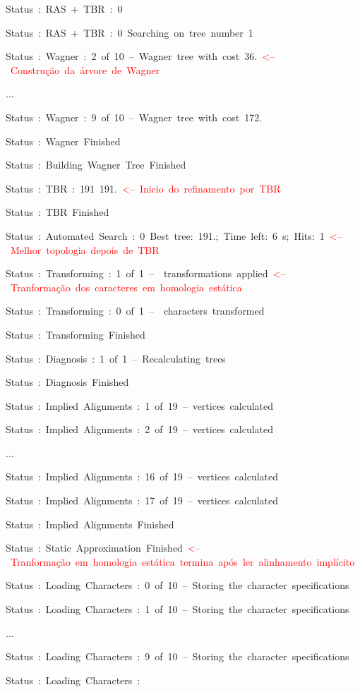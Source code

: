 \begin{refsection}
Status~:~RAS~+~TBR~:~0~

Status~:~RAS~+~TBR~:~0~Searching~on~tree~number~1

Status~:~Wagner~:~2~of~10~--~Wagner~tree~with~cost~36.~\textcolor{red}{<--~Construção~da~árvore~de~Wagner}

...

Status~:~Wagner~:~9~of~10~--~Wagner~tree~with~cost~172.

Status~:~Wagner~Finished

Status~:~Building~Wagner~Tree~Finished

Status~:~TBR~:~191~191.~\textcolor{red}{<--~Inicio~do~refinamento~por~TBR}

Status~:~TBR~Finished

Status~:~Automated~Search~:~0~Best~tree:~191.;~Time~left:~6~s;~Hits:~1~\textcolor{red}{<--~Melhor~topologia~depois~de~TBR}

Status~:~Transforming~:~1~of~1~--~~transformations~applied~\textcolor{red}{<--~Tranformação~dos~caracteres~em~homologia~estática}

Status~:~Transforming~:~0~of~1~--~~characters~transformed

Status~:~Transforming~Finished

Status~:~Diagnosis~:~1~of~1~--~Recalculating~trees

Status~:~Diagnosis~Finished

Status~:~Implied~Alignments~:~1~of~19~--~vertices~calculated

Status~:~Implied~Alignments~:~2~of~19~--~vertices~calculated

...

Status~:~Implied~Alignments~:~16~of~19~--~vertices~calculated

Status~:~Implied~Alignments~:~17~of~19~--~vertices~calculated

Status~:~Implied~Alignments~Finished

Status~:~Static~Approximation~Finished~\textcolor{red}{<--~Tranformação~em~homologia~estática~termina~após~ler~alinhamento~implícito}

Status~:~Loading~Characters~:~0~of~10~--~Storing~the~character~specifications

Status~:~Loading~Characters~:~1~of~10~--~Storing~the~character~specifications

...

Status~:~Loading~Characters~:~9~of~10~--~Storing~the~character~specifications

Status~:~Loading~Characters~:


\end{refsection}
